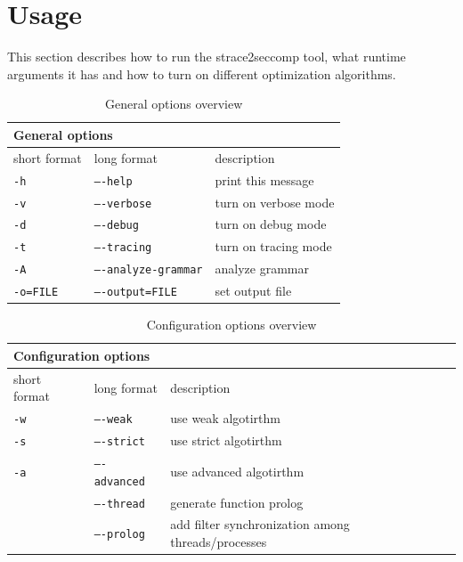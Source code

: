 \pagebreak
\section{Usage}

This section describes how to run the strace2seccomp tool, what runtime arguments
it has and how to turn on different optimization algorithms.

\begin{table}[h]
\centering
	\begin{tabular}{||l|l|p{6cm}||}
	\hline
	\multicolumn{3}{||l||}{\textbf{General options}}              \\ \hline\hline
	short format & long format         & description \\ \hline
	\texttt{-h}           & \texttt{----help}              & print this message \\
	\texttt{-v}           & \texttt{----verbose}           & turn on verbose mode \\
	\texttt{-d}           & \texttt{----debug}             & turn on debug mode \\
	\texttt{-t}           & \texttt{----tracing}           & turn on tracing mode \\
	\texttt{-A}           & \texttt{----analyze-grammar}   & analyze grammar \\
	\texttt{-o=FILE}      & \texttt{----output=FILE}       &  set output file \\ \hline
	\end{tabular}
	\caption{General options overview}
	\label{my-label}
\end{table}

\begin{table}[h]
\centering
	\begin{tabular}{||l|l|p{6cm}||}
	\hline
	\multicolumn{3}{||l||}{\textbf{Configuration options}}              \\ \hline\hline
	short format & long format         & description \\ \hline
	\texttt{-w}           & \texttt{----weak}         & use weak algotirthm \\
	\texttt{-s}           & \texttt{----strict}       & use strict algotirthm \\
	\texttt{-a}           & \texttt{----advanced}     & use advanced algotirthm \\
	                      & \texttt{----thread}       & generate function prolog \\
	                      & \texttt{----prolog}       & add filter synchronization among threads/processes \\ \hline
	\end{tabular}
	\caption{Configuration options overview}
	\label{my-label}
\end{table}


